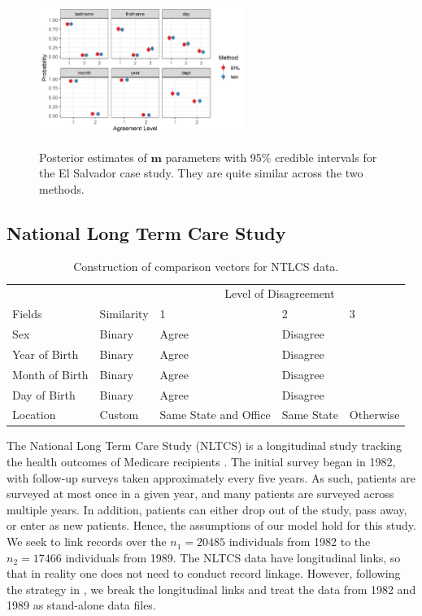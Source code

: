 \documentclass[ba]{imsart}
\begin{document}
	
	\begin{figure}[t]
		\begin{center}
			\includegraphics[width=0.6\textwidth]{../notes/figures/el_salvador/m_posterior_smallP} 
			\caption{Posterior estimates of $\bm{m}$ parameters with 95\% credible intervals for the El Salvador case study. They are quite similar across the two methods.}\label{fig:m-and-u}
			\label{fig:m-and-u}
		\end{center}
	\end{figure}
	
	\subsection{National Long Term Care Study}
	\label{nltcs}
	
	\begin{table}[t]
		\centering
		\begin{tabular}[t]{lllll}
			\multicolumn{2}{c}{ } & \multicolumn{3}{c}{Level of Disagreement} \\
			\cline{3-5}
			Fields & Similarity & 1 & 2 & 3\\
			\hline
			Sex & Binary & Agree & Disagree & \\
			Year of Birth & Binary & Agree & Disagree & \\
			Month of Birth & Binary & Agree & Disagree & \\
			Day of Birth & Binary & Agree & Disagree & \\
			Location & Custom & Same State and Office & Same State & Otherwise \\
			\hline
		\end{tabular}
		\caption{Construction of comparison vectors for NTLCS data.}\label{Tab:nltcs-comparisons}
	\end{table}
	
	The National Long Term Care Study (NLTCS) is a longitudinal study tracking the health outcomes of Medicare recipients \citep{steorts_bayesian_2016}. The initial survey began in 1982, with follow-up surveys taken approximately every five years. As such, patients are surveyed at most once in a given year, and many patients are surveyed across multiple years. In addition, patients can either drop out of the study, pass away, or enter as new patients. Hence, the assumptions of our model hold for this study. We seek to link records over the $n_1 = 20485$ individuals from 1982 to the $n_2 = 17466$ individuals from 1989. The NLTCS data have longitudinal links, so that in reality one does not need to conduct record linkage. However, following the strategy in \cite{guha:reiter:BA}, we break the longitudinal links and treat the data from 1982 and 1989 as stand-alone data files.
	
\end{document}
